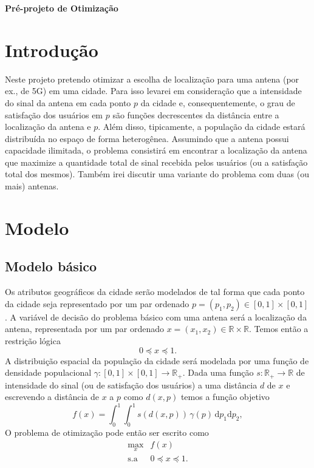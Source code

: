 \documentclass[a4paper,12pt]{article}
\begin{document}

\bigskip
\bigskip

\centerline{\bf\Large
Pré-projeto de Otimização}

\bigskip

\section{Introdução}
Neste projeto pretendo otimizar a escolha de localização para uma antena (por ex., de 5G) em uma cidade. Para isso levarei em consideração que a intensidade do sinal da antena em cada ponto $p$ da cidade e, consequentemente, o grau de satisfação dos usuários em $p$ são funções decrescentes da distância entre a localização da antena e $p$. Além disso, tipicamente, a população da cidade estará distribuída no espaço de forma heterogênea. Assumindo que a antena possui capacidade ilimitada, o problema consistirá em encontrar a localização da antena que maximize a quantidade total de sinal recebida pelos usuários (ou a satisfação total dos mesmos). Também irei discutir uma variante do problema com duas (ou mais) antenas.

\section{Modelo}

\subsection{Modelo básico}
\def\RR{\mathbb{R}}
\def\g{\gamma}
Os atributos geográficos da cidade serão modelados de tal forma que cada ponto da cidade seja representado por um par ordenado $p = (p_1,p_2) \in [0,1] \times [0,1]$. A variável de decisão do problema básico com uma antena será a localização da antena, representada por um par ordenado $x = (x_1,x_2) \in \RR \times \RR$. Temos então a restrição lógica
\begin{equation}
	0 \preceq x \preceq 1 .
\end{equation}
A distribuição espacial da população da cidade será modelada por uma função de densidade populacional $\g : [0,1] \times [0,1] \rightarrow \RR_{+}$. Dada uma função $s : \RR_{+} \rightarrow \RR $ de intensidade do sinal (ou de satisfação dos usuários) a uma distância $d$ de $x$ e escrevendo a distância de $x$ a $p$ como $d(x,p)$ temos a função objetivo
\begin{equation}
	f(x) = \int_0^1\int_0^1 s(d(x,p)) \, \g(p) \, \text{d}p_1\text{d}p_2 ,
\end{equation}
O problema de otimização pode então ser escrito como
\begin{equation}
	\label{problema}
	\begin{array}{rl}
		\max_{x} & f(x) \\[0.5ex] %
		\text{s.a} & 0 \preceq x \preceq 1 .
	\end{array}
\end{equation}
\end{document}
